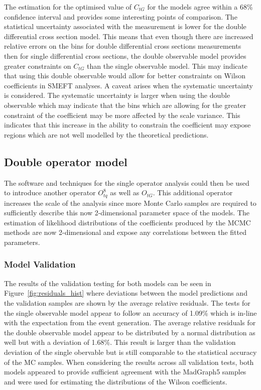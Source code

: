 \documentclass[a4paper,11pt]{article}
\begin{document}
The estimation for the optimised value of $C_{tG}$ for the models agree within a 68\% confidence interval and provides some interesting points of comparison.
The statistical uncertainty associated with the measurement is lower for the double differential cross section model.
This means that even though there are increased relative errors on the bins for double differential cross sections measurements then for single differential cross sections, the double observable model provides greater constraints on $C_{tG}$ than the single observable model.
This may indicate that using this double observable would allow for better constraints on Wilson coefficients in SMEFT analyses.
A caveat arises when the systematic uncertainty is considered.
The systematic uncertainty is larger when using the double observable which may indicate that the bins which are allowing for the greater constraint of the coefficient may be more affected by the scale variance.
This indicates that this increase in the ability to constrain the coefficient may expose regions which are not well modelled by the theoretical predictions.


\subsection{Double operator model}\label{sec:analysis_two_op}

The software and techniques for the single operator analysis could then be used to introduce another operator $O_{tq}^{8}$ as well as $O_{tG}$.
This additional operator increases the scale of the analysis since more Monte Carlo samples are required to sufficiently describe this now 2-dimensional parameter space of the models.
The estimation of likelihood distributions of the coefficients produced by the MCMC methods are now 2-dimensional and expose any correlations between the fitted parameters.

\subsubsection{Model Validation}

The results of the validation testing for both models can be seen in Figure~\ref{fig:residuals_hist} where deviations between the model predictions and the validation samples are shown by the average relative residuals.
The tests for the single observable model appear to follow an accuracy of 1.09\% which is in-line with the expectation from the event generation.
The average relative residuals for the double observable model appear to be distributed by a normal distribution as well but with a deviation of 1.68\%.
This result is larger than the validation deviation of the single obervable but is still comparable to the statistical accuracy of the MC samples.
When considering the results across all validation tests, both models appeared to provide sufficient agreement with the MadGraph5 samples and were used for estimating the distributions of the Wilson coefficients.
\end{document}
